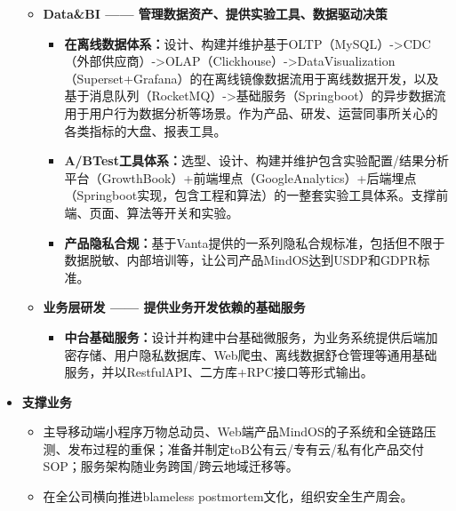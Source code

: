 \documentclass[letterpaper,11pt]{article}
\begin{document}
\begin{spacing}{1.0}
\begin{itemize}
\begin{itemize}
				\item \textbf{Data\&BI —— 管理数据资产、提供实验工具、数据驱动决策}
				\begin{itemize}
					\item     \textbf{在离线数据体系：}设计、构建并维护基于OLTP（MySQL）->CDC（外部供应商）->OLAP（Clickhouse）->DataVisualization（Superset+Grafana）的在离线镜像数据流用于离线数据开发，以及基于消息队列（RocketMQ）->基础服务（Springboot）的异步数据流用于用户行为数据分析等场景。作为产品、研发、运营同事所关心的各类指标的大盘、报表工具。
					\item
					\textbf{A/BTest工具体系：}选型、设计、构建并维护包含实验配置/结果分析平台（GrowthBook）+前端埋点（GoogleAnalytics）+后端埋点（Springboot实现，包含工程和算法）的一整套实验工具体系。支撑前端、页面、算法等开关和实验。
					\item
					\textbf{产品隐私合规：}基于Vanta提供的一系列隐私合规标准，包括但不限于数据脱敏、内部培训等，让公司产品MindOS达到USDP和GDPR标准。
				\end{itemize}
				
				\item \textbf{业务层研发 —— 提供业务开发依赖的基础服务}
				\begin{itemize}
					\item \textbf{中台基础服务：}设计并构建中台基础微服务，为业务系统提供后端加密存储、用户隐私数据库、Web爬虫、离线数据舒仓管理等通用基础服务，并以RestfulAPI、二方库+RPC接口等形式输出。
				\end{itemize}
			\end{itemize}
			\item \textbf{支撑业务}
			\begin{itemize}
				\item 主导移动端小程序万物总动员、Web端产品MindOS的子系统和全链路压测、发布过程的重保；准备并制定toB公有云/专有云/私有化产品交付SOP；服务架构随业务跨国/跨云地域迁移等。
				\item 在全公司横向推进blameless postmortem文化，组织安全生产周会。
			\end{itemize}
		\end{itemize}
		

\end{spacing}
\end{document}
